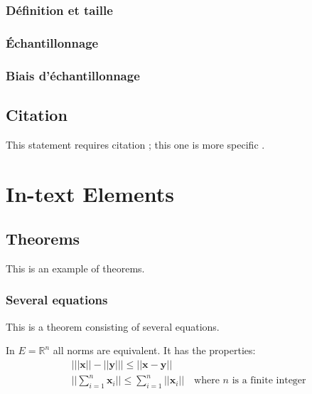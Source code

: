 \documentclass[11pt,fleqn]{book} %
\begin{document}
\subsection{Définition et taille}
\subsection{Échantillonnage}
\subsection{Biais d’échantillonnage}



\section{Citation}

This statement requires citation \cite{book_key}; this one is more specific \cite[122]{article_key}.




\chapter{In-text Elements}

\section{Theorems}

This is an example of theorems.

\subsection{Several equations}
This is a theorem consisting of several equations.

\begin{theorem}
In $E=\mathbb{R}^n$ all norms are equivalent. It has the properties:
\begin{align}
& \big| ||\mathbf{x}|| - ||\mathbf{y}|| \big|\leq || \mathbf{x}- \mathbf{y}||\\
&  ||\sum_{i=1}^n\mathbf{x}_i||\leq \sum_{i=1}^n||\mathbf{x}_i||\quad\text{where $n$ is a finite integer}
\end{align}
\end{theorem}
\end{document}
